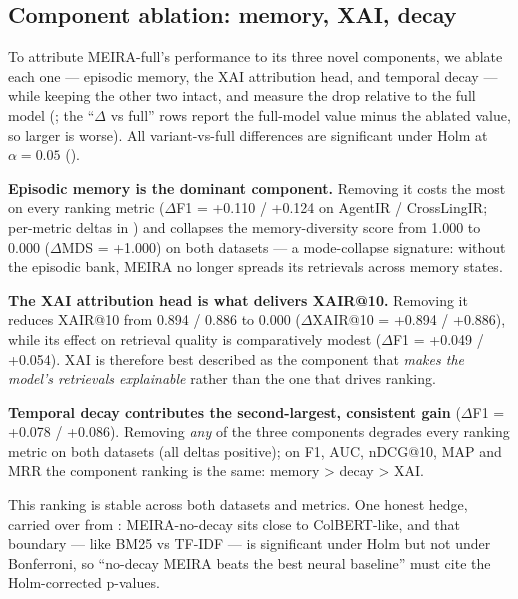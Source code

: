 \subsection{Component ablation: memory, XAI, decay}
\label{sec:results-ablation}

To attribute MEIRA-full's performance to its three novel components, we ablate each one --- episodic memory, the XAI attribution head, and temporal decay --- while keeping the other two intact, and measure the drop relative to the full model (; the ``$\Delta$ vs full'' rows report the full-model value minus the ablated value, so larger is worse). All variant-vs-full differences are significant under Holm at $\alpha = 0.05$ ().

\textbf{Episodic memory is the dominant component.} Removing it costs the most on every ranking metric ($\Delta$F1 = +0.110 / +0.124 on AgentIR / CrossLingIR; per-metric deltas in ) and collapses the memory-diversity score from 1.000 to 0.000 ($\Delta$MDS = +1.000) on both datasets --- a mode-collapse signature: without the episodic bank, MEIRA no longer spreads its retrievals across memory states.

\textbf{The XAI attribution head is what delivers XAIR@10.} Removing it reduces XAIR@10 from 0.894 / 0.886 to 0.000 ($\Delta$XAIR@10 = +0.894 / +0.886), while its effect on retrieval quality is comparatively modest ($\Delta$F1 = +0.049 / +0.054). XAI is therefore best described as the component that \emph{makes the model's retrievals explainable} rather than the one that drives ranking.

\textbf{Temporal decay contributes the second-largest, consistent gain} ($\Delta$F1 = +0.078 / +0.086). Removing \emph{any} of the three components degrades every ranking metric on both datasets (all deltas positive); on F1, AUC, nDCG@10, MAP and MRR the component ranking is the same: memory > decay > XAI.

This ranking is stable across both datasets and metrics. One honest hedge, carried over from : MEIRA-no-decay sits close to ColBERT-like, and that boundary --- like BM25 vs TF-IDF --- is significant under Holm but not under Bonferroni, so ``no-decay MEIRA beats the best neural baseline'' must cite the Holm-corrected p-values.

